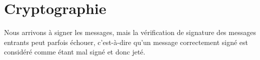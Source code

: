 \section{Cryptographie}
Nous arrivons à signer les messages, mais la vérification de signature des messages entrants peut parfois échouer, c'est-à-dire qu'un message correctement signé est considéré comme étant mal signé et donc jeté.

